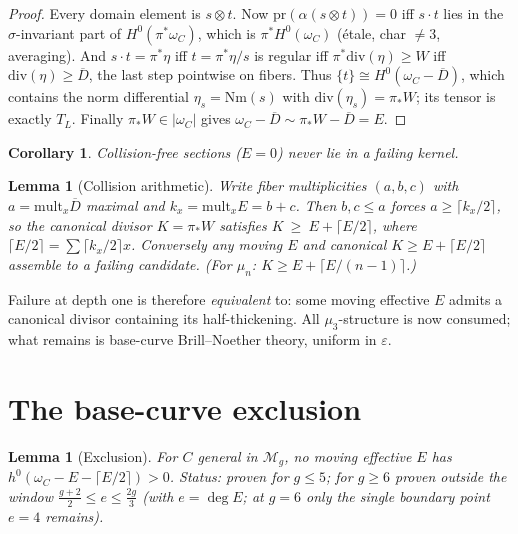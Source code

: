 \documentclass[11pt]{article}
\newtheorem{lemma}[theorem]{Lemma}
\newtheorem{corollary}[theorem]{Corollary}
\newcommand{\Nm}{\mathrm{Nm}}
\newcommand{\Dbar}{\overline{D}}
\begin{document}
\begin{proof}
Every domain element is $s\otimes t$.  Now
$\mathrm{pr}(\alpha(s\otimes t))=0$ iff $s\cdot t$ lies in the $\sigma$-invariant
part of $H^0(\pi^*\omega_C)$, which is $\pi^*H^0(\omega_C)$ (\'etale, char
$\neq3$, averaging).  And $s\cdot t=\pi^*\eta$ iff $t=\pi^*\eta/s$ is regular iff
$\pi^*\mathrm{div}(\eta)\ge W$ iff $\mathrm{div}(\eta)\ge\Dbar$, the last step
pointwise on fibers.  Thus $\{t\}\cong H^0(\omega_C-\Dbar)$, which contains the
norm differential $\eta_s=\Nm(s)$ with $\mathrm{div}(\eta_s)=\pi_*W$; its tensor is
exactly $T_L$.  Finally $\pi_*W\in|\omega_C|$ gives
$\omega_C-\Dbar\sim\pi_*W-\Dbar=E$.
\end{proof}

\begin{corollary}\label{cor:A1}
Collision-free sections ($E=0$) never lie in a failing kernel.
\end{corollary}

\begin{lemma}[Collision arithmetic]\label{lem:B}
Write fiber multiplicities $(a,b,c)$ with $a=\mathrm{mult}_x\Dbar$ maximal and
$k_x=\mathrm{mult}_xE=b+c$.  Then $b,c\le a$ forces $a\ge\lceil k_x/2\rceil$, so the
canonical divisor $K=\pi_*W$ satisfies
$K\ \ge\ E+\lceil E/2\rceil$, where $\lceil E/2\rceil=\sum\lceil k_x/2\rceil x$.
Conversely any moving $E$ and canonical $K\ge E+\lceil E/2\rceil$ assemble to a
failing candidate.  (For $\mu_n$: $K\ge E+\lceil E/(n-1)\rceil$.)
\end{lemma}

Failure at depth one is therefore \emph{equivalent} to: some moving effective $E$
admits a canonical divisor containing its half-thickening.  All $\mu_3$-structure
is now consumed; what remains is base-curve Brill--Noether theory, uniform in
$\varepsilon$.

\section{The base-curve exclusion}\label{sec:lemmaC}

\begin{lemma}[Exclusion]\label{lem:C}
For $C$ general in $\mathcal M_g$, no moving effective $E$ has
$h^0(\omega_C-E-\lceil E/2\rceil)>0$.  Status: proven for $g\le5$; for $g\ge6$
proven outside the window $\tfrac{g+2}2\le e\le\tfrac{2g}3$ (with $e=\deg E$; at
$g=6$ only the single boundary point $e=4$ remains).
\end{lemma}
\end{document}
